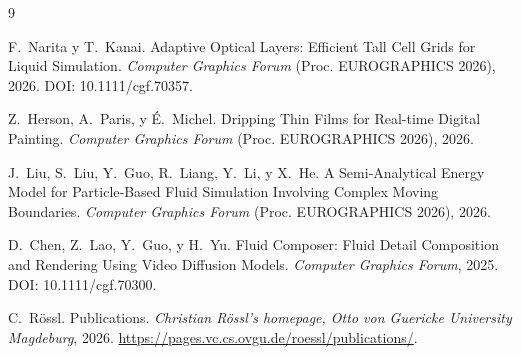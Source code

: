 \documentclass[sigconf,nonacm]{acmart}
\begin{document}
\begin{thebibliography}{9}

F.~Narita y T.~Kanai.
\newblock Adaptive Optical Layers: Efficient Tall Cell Grids for Liquid Simulation.
\newblock \emph{Computer Graphics Forum} (Proc. EUROGRAPHICS 2026), 2026. DOI: 10.1111/cgf.70357.

Z.~Herson, A.~Paris, y É.~Michel.
\newblock Dripping Thin Films for Real-time Digital Painting.
\newblock \emph{Computer Graphics Forum} (Proc. EUROGRAPHICS 2026), 2026.

J.~Liu, S.~Liu, Y.~Guo, R.~Liang, Y.~Li, y X.~He.
\newblock A Semi-Analytical Energy Model for Particle-Based Fluid Simulation Involving Complex Moving Boundaries.
\newblock \emph{Computer Graphics Forum} (Proc. EUROGRAPHICS 2026), 2026.

D.~Chen, Z.~Lao, Y.~Guo, y H.~Yu.
\newblock Fluid Composer: Fluid Detail Composition and Rendering Using Video Diffusion Models.
\newblock \emph{Computer Graphics Forum}, 2025. DOI: 10.1111/cgf.70300.

C.~Rössl.
\newblock Publications.
\newblock \emph{Christian Rössl's homepage, Otto von Guericke University Magdeburg}, 2026. \url{https://pages.vc.cs.ovgu.de/roessl/publications/}.

\end{thebibliography}
\end{document}
